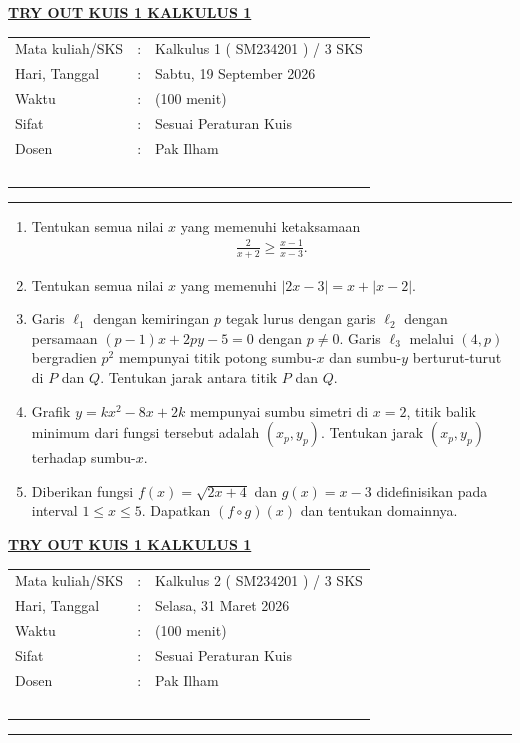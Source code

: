 \documentclass[10pt,openany,a4paper]{article}
\theoremstyle{definition}
\theoremstyle{definition}
\theoremstyle{plain}
\begin{document}
    \begin{center}
	{\underline{\textbf{\MakeUppercase{Try Out KUIS 1 Kalkulus 1}}}}
    \end{center}

    \begin{center}
	\begin{tabular}{lcl}
		Mata kuliah/SKS & : & Kalkulus 1 ( SM234201 ) / 3 SKS\\
		Hari, Tanggal & : & Sabtu, 19 September 2026\\
		Waktu & : & (100 menit)\\
		Sifat & : & Sesuai Peraturan Kuis\\
        Dosen & : & Pak Ilham\\
  ~
	\end{tabular}
    
    \noindent\rule{\textwidth}{2.pt}
        \end{center}
\begin{enumerate}
    \item Tentukan semua nilai $x$ yang memenuhi ketaksamaan 
    \begin{align*}
        \frac{2}{x+2}\geq \frac{x-1}{x-3}.
    \end{align*}
    \item Tentukan semua nilai $x$ yang memenuhi $|2x-3|=x+|x-2|$.
    \item Garis $\ell_1$ dengan kemiringan $p$ tegak lurus dengan garis $\ell_2$ dengan persamaan $(p-1)x+2py-5=0$ dengan $p\neq 0$. Garis $\ell_3$ melalui $(4,p)$ bergradien $p^2$ mempunyai titik potong sumbu-$x$ dan sumbu-$y$ berturut-turut di $P$ dan $Q$. Tentukan jarak antara titik $P$ dan $Q$.
    \item Grafik $y=kx^2-8x+2k$ mempunyai sumbu simetri di $x=2$, titik balik minimum dari fungsi tersebut adalah $(x_p,y_p)$. Tentukan jarak $(x_p,y_p)$ terhadap sumbu-$x$.
    \item Diberikan fungsi $f(x)=\sqrt{2x+4}$ dan $g(x)=x-3$ didefinisikan pada interval $1\leq x\leq 5$. Dapatkan $(f\circ g)(x)$ dan tentukan domainnya.
\end{enumerate}
\newpage 
{}
 \begin{center}
    {\underline{\textbf{\MakeUppercase{Try Out KUIS 1 KALKULUS 1}}}}
    \end{center}
    \begin{center}
	\begin{tabular}{lcl}
		Mata kuliah/SKS & : & Kalkulus 2 ( SM234201 ) / 3 SKS\\
		Hari, Tanggal & : & Selasa, 31 Maret 2026\\
		Waktu & : & (100 menit)\\
		Sifat & : & Sesuai Peraturan Kuis\\
        Dosen & : & Pak Ilham\\
  ~
	\end{tabular}
    
    \noindent\rule{\textwidth}{2.pt}
        \end{center}
\end{document}
